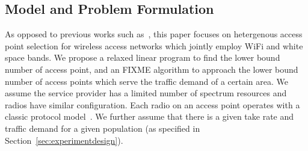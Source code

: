 %
%   
%

\subsection{Model and Problem Formulation}
\label{subsec:problem}

As opposed to previous works such as~\cite{franklin2007node,robinson2010deploying
,si2010overview}, this paper focuses on hetergenous access point selection 
for wireless access networks which jointly employ WiFi and white space bands.
We propose a relaxed linear program to find the lower bound number of access point,
and an FIXME algorithm  to approach the lower bound number of access points which serve
the traffic demand of a certain area. We assume the service provider has a limited number 
of spectrum resources and radios have similar configuration. Each radio on an access 
point operates with a classic protocol model~\cite{gupta2000capacity}. 
We further assume that there is a given take rate and traffic demand for a given 
population (as specified in Section~\ref{sec:experimentdesign}).

